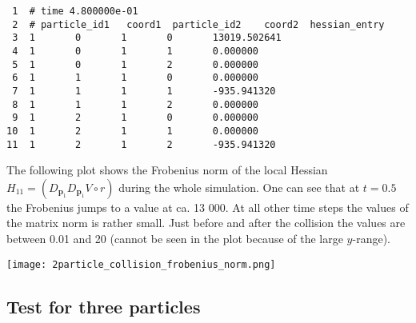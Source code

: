 \documentclass[a4paper]{article}
\newcommand{\boldp}{\boldsymbol{p}}
\begin{document}
\begin{enumerate}
\begin{verbatim}
 1  # time 4.800000e-01
 2  # particle_id1   coord1  particle_id2    coord2  hessian_entry
 3  1       0       1       0       13019.502641
 4  1       0       1       1       0.000000
 5  1       0       1       2       0.000000
 6  1       1       1       0       0.000000
 7  1       1       1       1       -935.941320
 8  1       1       1       2       0.000000
 9  1       2       1       0       0.000000
10  1       2       1       1       0.000000
11  1       2       1       2       -935.941320
\end{verbatim}
The following plot shows the Frobenius norm of the local Hessian \(H_{11} = (D_{\boldp_1} D_{\boldp_1} V\circ r)\) during the whole simulation.
One can see that at \(t = 0.5\) the Frobenius jumps to a value at ca. 13 000. At all other time steps the values of the matrix norm is rather small.
Just before and after the collision the values are between 0.01 and 20 (cannot be seen in the plot because of the large \(y\)-range).

\texttt{[image: 2particle\_collision\_frobenius\_norm.png]}
\end{enumerate}

\subsection{Test for three particles}
\label{sec-1-5}
\end{document}
